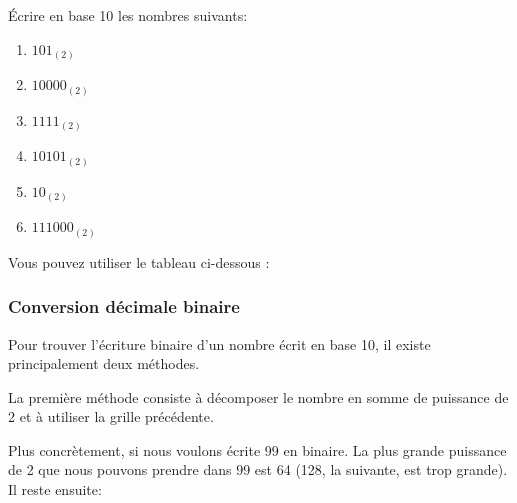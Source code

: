 \documentclass[11pt, a4paper]{book}
\begin{document}
\begin{exercice}
\'Ecrire en base 10 les nombres suivants:
\begin{multicols}{2}
\begin{enumerate}
\item $101_{(2)}$
\item $10 000_{(2)}$
\item $1111_{(2)}$
\item $10101_{(2)}$
\item $10_{(2)}$
\item $111 000_{(2)}$

\end{enumerate}
\end{multicols}

Vous pouvez utiliser le tableau ci-dessous : 

\begin{center}
\end{center} 

\end{exercice}

\subsubsection{Conversion décimale binaire}

Pour trouver l'écriture binaire d'un nombre écrit en base 10, il existe principalement deux méthodes. 


\; 

La première méthode consiste à décomposer le nombre en somme de puissance de 2 et à utiliser la grille précédente. 

Plus concrètement, si nous voulons écrite 99 en binaire. La plus grande puissance de 2 que nous pouvons prendre dans 99 est 64 (128, la suivante, est trop grande). Il reste ensuite: 
\end{document}
